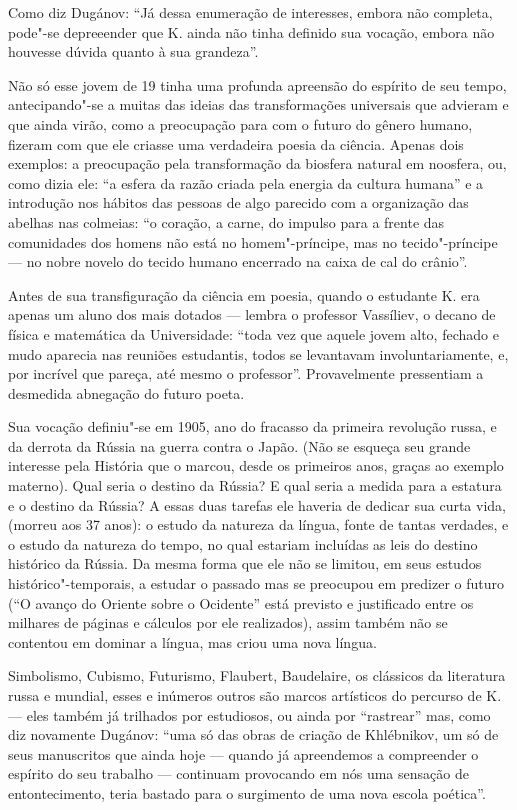 Como diz Dugánov: ``Já dessa enumeração de interesses, embora não
completa, pode"-se depreeender que K. ainda não tinha definido sua
vocação, embora não houvesse dúvida quanto à sua grandeza''.

Não só esse jovem de 19 tinha uma profunda apreensão do espírito de seu
tempo, antecipando"-se a muitas das ideias das transformações universais
que advieram e que ainda virão, como a preocupação para com o futuro do
gênero humano, fizeram com que ele criasse uma verdadeira poesia da
ciência. Apenas dois exemplos: a preocupação pela transformação da
biosfera natural em noosfera, ou, como dizia ele: ``a esfera da razão
criada pela energia da cultura humana'' e a introdução nos hábitos das
pessoas de algo parecido com a organização das abelhas nas colmeias: ``o coração, a carne, do impulso para a frente das comunidades dos homens
não está no homem"-príncipe, mas no tecido"-príncipe --- no nobre novelo do
tecido humano encerrado na caixa de cal do crânio''.

Antes de sua transfiguração da ciência em poesia, quando o estudante K.
era apenas um aluno dos mais dotados --- lembra o professor Vassíliev, o
decano de física e matemática da Universidade: ``toda vez que aquele
jovem alto, fechado e mudo aparecia nas reuniões estudantis, todos se
levantavam involuntariamente, e, por incrível que pareça, até mesmo o
professor''. Provavelmente pressentiam a desmedida abnegação do futuro
poeta.

Sua vocação definiu"-se em 1905, ano do fracasso da primeira revolução
russa, e da derrota da Rússia na guerra contra o Japão. (Não se esqueça
seu grande interesse pela História que o marcou, desde os primeiros
anos, graças ao exemplo materno). Qual seria o destino da Rússia? E qual
seria a medida para a estatura e o destino da Rússia? A essas duas
tarefas ele haveria de dedicar sua curta vida, (morreu aos
37 anos): o estudo da natureza da língua, fonte de tantas verdades, e o
estudo da natureza do tempo, no qual estariam incluídas as leis do
destino histórico da Rússia. Da mesma forma que ele não se limitou, em
seus estudos histórico"-temporais, a estudar o passado mas se preocupou
em predizer o futuro (``O avanço do Oriente sobre o Ocidente'' está
previsto e justificado entre os milhares de páginas e cálculos por ele
realizados), assim também não se contentou em dominar a língua, mas
criou uma nova língua.

Simbolismo, Cubismo, Futurismo, Flaubert, Baudelaire, os clássicos da
literatura russa e mundial, esses e inúmeros outros são marcos
artísticos do percurso de K. --- eles também já trilhados por estudiosos,
ou ainda por ``rastrear'' mas, como diz novamente Dugánov: ``uma só das
obras de criação de Khlébnikov, um só de seus manuscritos que ainda hoje
--- quando já apreendemos a compreender o espírito do seu trabalho ---
continuam provocando em nós uma sensação de entontecimento, teria
bastado para o surgimento de uma nova escola poética''.

